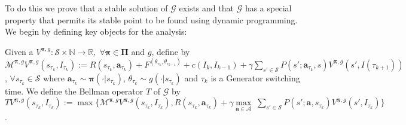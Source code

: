 \documentclass{article}
\newtheorem{theorem}{Theorem}
\begin{document}
% 
% 
To do this we prove that a stable solution of $\mathcal{G}$ exists and that $\mathcal{G}$ has a special property that permits its stable point to be found using dynamic programming. We begin by defining key objects for the analysis:

Given a $V^{\boldsymbol{\pi},g}:\mathcal{S}\times\mathbb{N}\to\mathbb{R},\;\forall\boldsymbol{\pi}\in\boldsymbol{\Pi}$ and $g$, define by $
\mathcal{M}^{\boldsymbol{\pi},g}V^{\boldsymbol{\pi},g}(s_{\tau_k},I_{\tau_k}):=R(s_{\tau_k},\boldsymbol{a}_{\tau_k})+F^{(\theta_{\tau_k},\theta_{\tau_{k-1}})}+c(I_k,I_{k-1})+\gamma\sum_{s'\in\mathcal{S}}P(s';\boldsymbol{a}_{\tau_k},s)V^{\boldsymbol{\pi},g}(s',I(\tau_{k+1}))$, $\forall s_{\tau_k}\in\mathcal{S}$ where $\boldsymbol{a}_{\tau_k}\sim \boldsymbol{\pi}(\cdot|s_{\tau_k})$, $\theta_{\tau_k}\sim  g(\cdot|s_{\tau_k})$ and $\tau_k$ is a  {\selectfont Generator} switching time.
We define the Bellman operator $T$ of $\mathcal{G}$ by $T V^{\boldsymbol{\pi},g}(s_{\tau_k},I_{\tau_k}):=\max\Big\{\mathcal{M}^{\boldsymbol{\pi},g}V^{\boldsymbol{\pi},g}(s_{\tau_k},I_{\tau_k}),  R(s_{\tau_k},\boldsymbol{a}_{\tau_k})+\gamma\underset{\boldsymbol{a}\in\boldsymbol{\mathcal{A}}}{\max}\;\sum_{s'\in\mathcal{S}}P(s';\boldsymbol{a},s_{\tau_k})V^{\boldsymbol{\pi},g}(s',I_{\tau_k})\Big\}$. 
\end{document}
